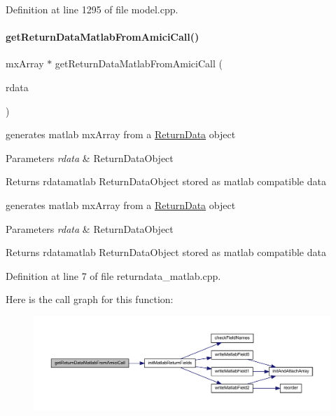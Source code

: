 Definition at line 1295 of file model.\+cpp.

\mbox{\label{namespaceamici_a698409f4b9ce06055bcebcee39f81a91}} 
\paragraph{\texorpdfstring{get\+Return\+Data\+Matlab\+From\+Amici\+Call()}{getReturnDataMatlabFromAmiciCall()}}
{\footnotesize\ttfamily mx\+Array $\ast$ get\+Return\+Data\+Matlab\+From\+Amici\+Call (\begin{DoxyParamCaption}\item[{\mbox{\hyperlink{classamici_1_1_return_data}{Return\+Data}} const $\ast$}]{rdata }\end{DoxyParamCaption})}

generates matlab mx\+Array from a \mbox{\hyperlink{classamici_1_1_return_data}{Return\+Data}} object 
\begin{DoxyParams}{Parameters}
{\em rdata} & Return\+Data\+Object \\
\hline
\end{DoxyParams}
\begin{DoxyReturn}{Returns}
rdatamatlab Return\+Data\+Object stored as matlab compatible data
\end{DoxyReturn}
generates matlab mx\+Array from a \mbox{\hyperlink{classamici_1_1_return_data}{Return\+Data}} object 
\begin{DoxyParams}{Parameters}
{\em rdata} & Return\+Data\+Object \\
\hline
\end{DoxyParams}
\begin{DoxyReturn}{Returns}
rdatamatlab Return\+Data\+Object stored as matlab compatible data
\end{DoxyReturn}


Definition at line 7 of file returndata\+\_\+matlab.\+cpp.

Here is the call graph for this function\+:
\nopagebreak
\begin{figure}[H]
\begin{center}
\leavevmode
\includegraphics[width=350pt]{namespaceamici_a698409f4b9ce06055bcebcee39f81a91_cgraph}
\end{center}
\end{figure}
\mbox{\label{namespaceamici_a7449834fca1e0bde53d5f73ae0d2b929}} 
